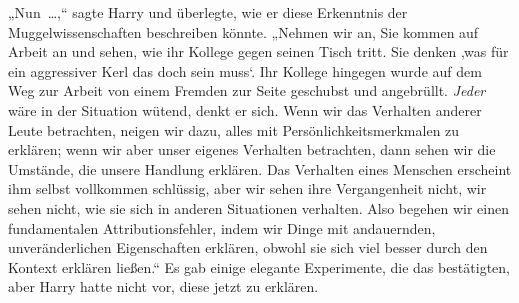 „Nun …,“ sagte Harry und überlegte, wie er diese Erkenntnis der Muggelwissenschaften beschreiben könnte. „Nehmen wir an, Sie kommen auf Arbeit an und sehen, wie ihr Kollege gegen seinen Tisch tritt. Sie denken ‚was für ein aggressiver Kerl das doch sein muss‘. Ihr Kollege hingegen wurde auf dem Weg zur Arbeit von einem Fremden zur Seite geschubst und angebrüllt. \emph{Jeder} wäre in der Situation wütend, denkt er sich. Wenn wir das Verhalten anderer Leute betrachten, neigen wir dazu, alles mit Persönlichkeitsmerkmalen zu erklären; wenn wir aber unser eigenes Verhalten betrachten, dann sehen wir die Umstände, die unsere Handlung erklären. Das Verhalten eines Menschen erscheint ihm selbst vollkommen schlüssig, aber wir sehen ihre Vergangenheit nicht, wir sehen nicht, wie sie sich in anderen Situationen verhalten. Also begehen wir einen fundamentalen Attributionsfehler, indem wir Dinge mit andauernden, unveränderlichen Eigenschaften erklären, obwohl sie sich viel besser durch den Kontext erklären ließen.“
Es gab einige elegante Experimente, die das bestätigten, aber Harry hatte nicht vor, diese jetzt zu erklären.

